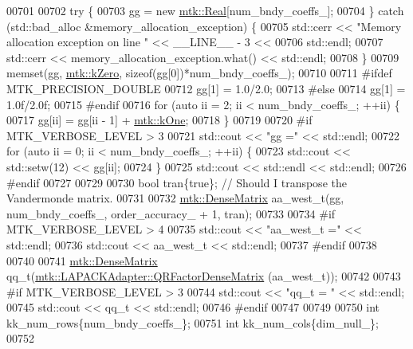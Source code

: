 \begin{DoxyCode}
{{00701 
00702   \textcolor{keywordflow}{try} \{
00703     gg = \textcolor{keyword}{new} \hyperlink{group__c01-roots_gac080bbbf5cbb5502c9f00405f894857d}{mtk::Real}[num\_bndy\_coeffs\_];
00704   \} \textcolor{keywordflow}{catch} (std::bad\_alloc &memory\_allocation\_exception) \{
00705     std::cerr << \textcolor{stringliteral}{"Memory allocation exception on line "} << \_\_LINE\_\_ - 3 <<
00706       std::endl;
00707     std::cerr << memory\_allocation\_exception.what() << std::endl;
00708   \}
00709   memset(gg, \hyperlink{group__c01-roots_ga59a451a5fae30d59649bcda274fea271}{mtk::kZero}, \textcolor{keyword}{sizeof}(gg[0])*num\_bndy\_coeffs\_);
00710 
00711 \textcolor{preprocessor}{  #ifdef MTK\_PRECISION\_DOUBLE}
00712   gg[1] = 1.0/2.0;
00713 \textcolor{preprocessor}{  #else}
00714   gg[1] = 1.0f/2.0f;
00715 \textcolor{preprocessor}{  #endif}
00716   \textcolor{keywordflow}{for} (\textcolor{keyword}{auto} ii = 2; ii < num\_bndy\_coeffs\_; ++ii) \{
00717     gg[ii] = gg[ii - 1] + \hyperlink{group__c01-roots_ga26407c24d43b6b95480943340d285c71}{mtk::kOne};
00718   \}
00719 
00720 \textcolor{preprocessor}{  #if MTK\_VERBOSE\_LEVEL > 3}
00721   std::cout << \textcolor{stringliteral}{"gg ="} << std::endl;
00722   \textcolor{keywordflow}{for} (\textcolor{keyword}{auto} ii = 0; ii < num\_bndy\_coeffs\_; ++ii) \{
00723     std::cout << std::setw(12) << gg[ii];
00724   \}
00725   std::cout << std::endl << std::endl;
00726 \textcolor{preprocessor}{  #endif}
00727 
00729 
00730   \textcolor{keywordtype}{bool} tran\{\textcolor{keyword}{true}\}; \textcolor{comment}{// Should I transpose the Vandermonde matrix.}
00731 
00732   \hyperlink{classmtk_1_1DenseMatrix}{mtk::DenseMatrix} aa\_west\_t(gg, num\_bndy\_coeffs\_, order\_accuracy\_ + 1, tran);
00733 
00734 \textcolor{preprocessor}{  #if MTK\_VERBOSE\_LEVEL > 4}
00735   std::cout << \textcolor{stringliteral}{"aa\_west\_t ="} << std::endl;
00736   std::cout << aa\_west\_t << std::endl;
00737 \textcolor{preprocessor}{  #endif}
00738 
00740 
00741   \hyperlink{classmtk_1_1DenseMatrix}{mtk::DenseMatrix} qq\_t(\hyperlink{classmtk_1_1LAPACKAdapter_ae5c6e78c9c819c9ac7a6f31bfd011d7a}{mtk::LAPACKAdapter::QRFactorDenseMatrix}
      (aa\_west\_t));
00742 
00743 \textcolor{preprocessor}{  #if MTK\_VERBOSE\_LEVEL > 3}
00744   std::cout << \textcolor{stringliteral}{"qq\_t = "} << std::endl;
00745   std::cout << qq\_t << std::endl;
00746 \textcolor{preprocessor}{  #endif}
00747 
00749 
00750   \textcolor{keywordtype}{int} kk\_num\_rows\{num\_bndy\_coeffs\_\};
00751   \textcolor{keywordtype}{int} kk\_num\_cols\{dim\_null\_\};
00752 
}}
\end{DoxyCode}
